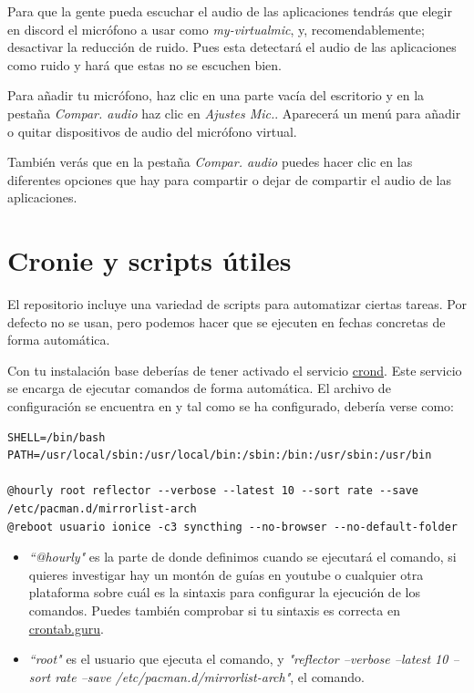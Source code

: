 \documentclass[11pt]{article}
\begin{document}
\vspace{5pt}

\noindent Para que la gente pueda escuchar el audio de las aplicaciones tendrás que elegir en discord el micrófono a usar como \textit{my-virtualmic}, y, recomendablemente; desactivar la reducción de ruido. Pues esta detectará el audio de las aplicaciones como ruido y hará que estas no se escuchen bien.

\vspace{5pt}

Para añadir tu micrófono, haz clic en una parte vacía del escritorio y en la pestaña \textit{Compar. audio} haz clic en \textit{Ajustes Mic.}. Aparecerá un menú para añadir o quitar dispositivos de audio del micrófono virtual.

\vspace{5pt}

\noindent También verás que en la pestaña \textit{Compar. audio} puedes hacer clic en las diferentes opciones que hay para compartir o dejar de compartir el audio de las aplicaciones.

\section{Cronie y scripts útiles}

El repositorio incluye una variedad de scripts para automatizar ciertas tareas. Por defecto no se usan, pero podemos hacer que se ejecuten en fechas concretas de forma automática.

\vspace{5pt}

\noindent Con tu instalación base deberías de tener activado el servicio \href{https://wiki.archlinux.org/title/cron}{crond}. Este servicio se encarga de ejecutar comandos de forma automática. El archivo de configuración se encuentra en  y tal como se ha configurado, debería verse como:

\vspace{10pt}

\begin{lstlisting}[basicstyle=\scriptsize\ttfamily]
SHELL=/bin/bash
PATH=/usr/local/sbin:/usr/local/bin:/sbin:/bin:/usr/sbin:/usr/bin

@hourly root reflector --verbose --latest 10 --sort rate --save /etc/pacman.d/mirrorlist-arch
@reboot usuario ionice -c3 syncthing --no-browser --no-default-folder
\end{lstlisting}

\begin{itemize}
	\item \textit{``@hourly"} es la parte de donde definimos cuando se ejecutará el comando, si quieres investigar hay un montón de guías en youtube o cualquier otra plataforma sobre cuál es la sintaxis para configurar la ejecución de los comandos. Puedes también comprobar si tu sintaxis es correcta en \href{https://crontab.guru/}{crontab.guru}.
	\item \textit{``root"} es el usuario que ejecuta el comando, y \textit{"reflector --verbose --latest 10 --sort rate --save /etc/pacman.d/mirrorlist-arch"}, el comando.
\end{itemize}
\end{document}
